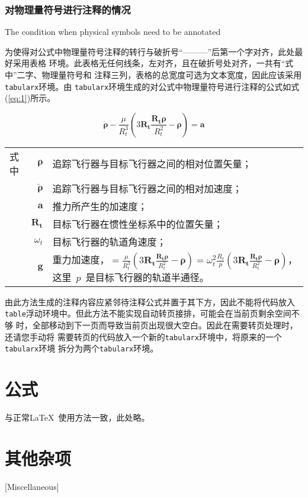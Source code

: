 \subsubsection{对物理量符号进行注释的情况}{The condition when physical symbols need to be annotated}

为使得对公式中物理量符号注释的转行与破折号“———”后第一个字对齐，此处最好采用表格
环境。此表格无任何线条，左对齐，且在破折号处对齐，一共有“式中”二字、物理量符号和
注释三列，表格的总宽度可选为文本宽度，因此应该采用\verb|tabularx|环境。由
\verb|tabularx|环境生成的对公式中物理量符号进行注释的公式如式(\ref{eq:1})所示。

\begin{equation}\label{eq:1}
\ddot{\boldsymbol{\rho}}-\frac{\mu}{R_{t}^{3}}\left(3\mathbf{R_{t}}\frac{\mathbf{R_{t}\rho}}{R_{t}^{2}}-\boldsymbol{\rho}\right)=\mathbf{a}
\end{equation}
\begin{tabularx}{\textwidth}{@{}l@{\quad}r@{———}X@{}}
式中& $\boldsymbol{\rho}$ &追踪飞行器与目标飞行器之间的相对位置矢量；\\
&  $\boldsymbol{\ddot{\rho}}$&追踪飞行器与目标飞行器之间的相对加速度；\\
&  $\mathbf{a}$   &推力所产生的加速度；\\
&  $\mathbf{R_t}$ & 目标飞行器在惯性坐标系中的位置矢量；\\
&  $\omega_{t}$ & 目标飞行器的轨道角速度；\\
&  $\mathbf{g}$ & 重力加速度，$=\frac{\mu}{R_{t}^{3}}\left(
3\mathbf{R_{t}}\frac{\mathbf{R_{t}\rho}}{R_{t}^{2}}-\boldsymbol{\rho}\right)=\omega_{t}^{2}\frac{R_{t}}{p}\left(
3\mathbf{R_{t}}\frac{\mathbf{R_{t}\rho}}{R_{t}^{2}}-\boldsymbol{\rho}\right)$，这里~$p$~是目标飞行器的轨道半通径。
\end{tabularx}\vspace{\baselineskip}

由此方法生成的注释内容应紧邻待注释公式并置于其下方，因此不能将代码放入
\verb|table|浮动环境中。但此方法不能实现自动转页接排，可能会在当前页剩余空间不够
时，全部移动到下一页而导致当前页出现很大空白。因此在需要转页处理时，还请您手动将
需要转页的代码放入一个新的\verb|tabularx|环境中，将原来的一个\verb|tabularx|环境
拆分为两个\verb|tabularx|环境。

\section{公式}
与正常\LaTeX\ 使用方法一致，此处略。

\section{其他杂项}[Miscellaneous]

